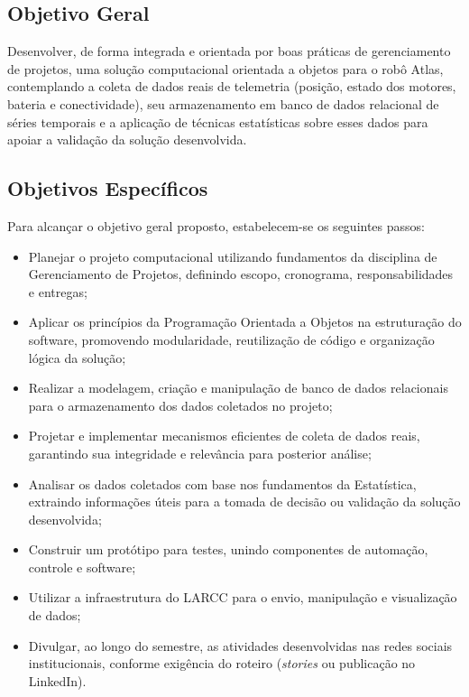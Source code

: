 \subsection{Objetivo Geral} \label{subsec:general_objective}
Desenvolver, de forma integrada e orientada por boas práticas de gerenciamento de projetos, uma solução computacional orientada a objetos para o robô Atlas, contemplando a coleta de dados reais de telemetria (posição, estado dos motores, bateria e conectividade), seu armazenamento em banco de dados relacional de séries temporais e a aplicação de técnicas estatísticas sobre esses dados para apoiar a validação da solução desenvolvida.

\subsection{Objetivos Específicos} \label{subsec:specific_objectives}
Para alcançar o objetivo geral proposto, estabelecem-se os seguintes passos:
\begin{itemize}
    \item Planejar o projeto computacional utilizando fundamentos da disciplina de Gerenciamento de Projetos, definindo escopo, cronograma, responsabilidades e entregas;
    \item Aplicar os princípios da Programação Orientada a Objetos na estruturação do software, promovendo modularidade, reutilização de código e organização lógica da solução;
    \item Realizar a modelagem, criação e manipulação de banco de dados relacionais para o armazenamento dos dados coletados no projeto;
    \item Projetar e implementar mecanismos eficientes de coleta de dados reais, garantindo sua integridade e relevância para posterior análise;
    \item Analisar os dados coletados com base nos fundamentos da Estatística, extraindo informações úteis para a tomada de decisão ou validação da solução desenvolvida;
    \item Construir um protótipo para testes, unindo componentes de automação, controle e software;
    \item Utilizar a infraestrutura do LARCC para o envio, manipulação e visualização de dados;
    \item Divulgar, ao longo do semestre, as atividades desenvolvidas nas redes sociais institucionais, conforme exigência do roteiro (\textit{stories} ou publicação no LinkedIn).
\end{itemize}

